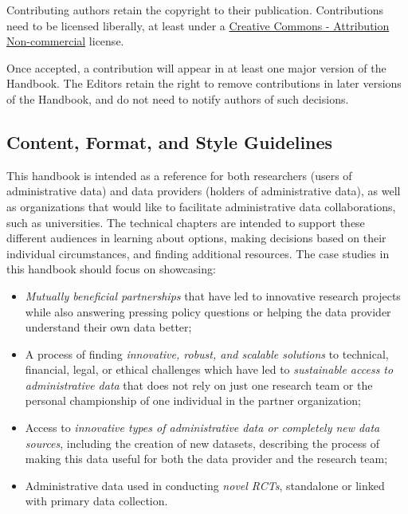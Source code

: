 \documentclass[
]{WileySix}
\providecommand{\tightlist}{%
  \setlength{\itemsep}{0pt}\setlength{\parskip}{0pt}}
\begin{document}
Contributing authors retain the copyright to their publication. Contributions need to be licensed liberally, at least under a \href{https://creativecommons.org/licenses/by-nc/4.0/legalcode}{Creative Commons - Attribution Non-commercial} license.

Once accepted, a contribution will appear in at least one major version of the Handbook. The Editors retain the right to remove contributions in later versions of the Handbook, and do not need to notify authors of such decisions.

\hypertarget{content-format-and-style-guidelines}{%
\subsection*{Content, Format, and Style Guidelines}\label{content-format-and-style-guidelines}}

This handbook is intended as a reference for both researchers (users of administrative data) and data providers (holders of administrative data), as well as organizations that would like to facilitate administrative data collaborations, such as universities. The technical chapters are intended to support these different audiences in learning about options, making decisions based on their individual circumstances, and finding additional resources. The case studies in this handbook should focus on showcasing:

\begin{itemize}
\tightlist
\item
  \emph{Mutually beneficial partnerships} that have led to innovative research projects while also answering pressing policy questions or helping the data provider understand their own data better;
\item
  A process of finding \emph{innovative, robust, and scalable solutions} to technical, financial, legal, or ethical challenges which have led to \emph{sustainable access to administrative data} that does not rely on just one research team or the personal championship of one individual in the partner organization;
\item
  Access to \emph{innovative types of administrative data or completely new data sources}, including the creation of new datasets, describing the process of making this data useful for both the data provider and the research team;
\item
  Administrative data used in conducting \emph{novel RCTs}, standalone or linked with primary data collection.
\end{itemize}
\end{document}
